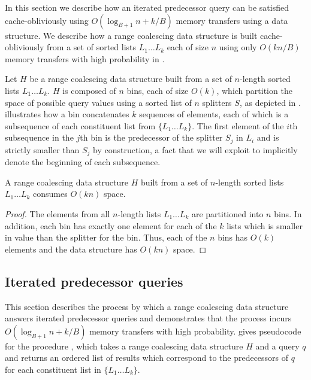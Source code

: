 
In this section we describe how an iterated predecessor query can be 
satisfied cache-obliviously using $O(\log_{B+1} n + k/B)$ 
memory transfers using a  data structure.  
We describe how a range coalescing data structure is built 
cache-obliviously from a set of sorted lists $L_1 \ldots L_k$ each of size $n$ 
using only $O(kn/B)$ memory transfers with high probability in .  


Let $H$ be a range coalescing data structure built from a set of $n$-length
sorted lists $L_1 \ldots L_k$.  $H$ is composed of $n$ bins, each of size $O(k)$,
which partition the space of possible query values using a sorted list of $n$ 
splitters $S$, as depicted in .  
illustrates how a bin concatenates $k$ sequences of elements, each of which is a 
subsequence of each constituent list from $\{L_1 \ldots L_k\}$.  
The first element of the $i$th subsequence in the $j$th bin is the predecessor
of the splitter $S_j$ in $L_i$ and is strictly smaller than $S_j$ by construction, 
a fact that we will exploit to implicitly denote the beginning of each subsequence.  

\begin{lemma}
A range coalescing data structure $H$ built from a set of $n$-length
sorted lists $L_1 \ldots L_k$ consumes $O(kn)$ space.
\end{lemma}
\begin{proof}
The elements from all $n$-length lists $L_1 \ldots L_k$ are partitioned 
into $n$ bins.  In addition, each bin has exactly one element for each of 
the $k$ lists which is smaller in value than the splitter for the bin.  Thus, each
of the $n$ bins has $O(k)$ elements and the data structure has $O(kn)$ space.
\end{proof}


\subsection*{Iterated predecessor queries}

This section describes the process by which a range coalescing data structure
answers iterated predecessor queries and demonstrates that the process incurs
$O(\log_{B+1} n + k/B)$ memory transfers with high probability.  
gives pseudocode for the procedure , which takes a range
coalescing data structure $H$ and a query $q$ and returns an ordered list of results which
correspond to the predecessors of $q$ for each constituent list in $\{ L_1 \ldots L_k \}$.

